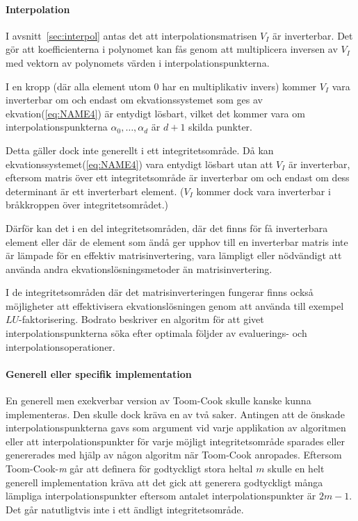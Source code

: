 \paragraph{Interpolation}
I avsnitt~\ref{sec:interpol} antas det att interpolationsmatrisen
$V_I$ är inverterbar. Det gör att koefficienterna i polynomet kan fås genom att
multiplicera inversen av $V_I$ med vektorn av polynomets värden i
interpolationspunkterna.

I en kropp (där alla element utom 0 har en multiplikativ invers) kommer $V_I$
vara inverterbar om och endast om ekvationssystemet som ges av ekvation(\ref{eq:NAME4})
är entydigt lösbart, vilket det kommer vara om interpolationspunkterna
$\alpha_0, \dots, \alpha_d$ är $d + 1$ skilda punkter.

Detta gäller dock inte generellt i ett integritetsområde. Då kan
ekvationssystemet(\ref{eq:NAME4}) vara entydigt lösbart utan att $V_I$ är
inverterbar, eftersom matris över ett integritetsområde är inverterbar om och
endast om dess determinant är ett inverterbart
element\cite{sombatboriboon2011some}. ($V_I$ kommer dock vara inverterbar i
bråkkroppen över integritetsområdet.)

Därför kan det i en del integritetsområden, där det finns för få inverterbara element
eller där de element som ändå ger upphov till en inverterbar matris inte är
lämpade för en effektiv matrisinvertering, vara lämpligt eller nödvändigt att
använda andra ekvationslösningsmetoder än matrisinvertering.


I de integritetsområden där det matrisinverteringen fungerar finns också möjligheter att
effektivisera ekvationslösningen genom att använda till exempel
$LU$-faktorisering. Bodrato\cite{bodrato2007towards}\cite{bodrato2007integer}
beskriver en algoritm för att givet interpolationspunkterna söka efter optimala
följder av evaluerings- och interpolationsoperationer.

\paragraph{Generell eller specifik implementation}
En generell men exekverbar version av Toom-Cook skulle kanske kunna
implementeras. Den skulle dock kräva en av två saker. Antingen att de önskade
interpolationspunkterna gavs som argument vid varje applikation av algoritmen
eller att interpolationspunkter för varje möjligt integritetsområde sparades
eller genererades med hjälp av någon algoritm när Toom-Cook anropades. Eftersom
Toom-Cook-\emph{m} går att definera för godtyckligt stora heltal $m$ skulle en
helt generell implementation kräva att det gick att generera godtyckligt många
lämpliga interpolationspunkter eftersom antalet interpolationspunkter är $2m-1$.
Det går natutligtvis inte i ett ändligt integritetsområde.

